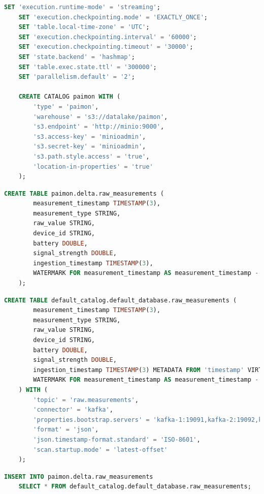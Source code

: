 \begin{lstlisting}[language=sql]
    SET 'execution.runtime-mode' = 'streaming';
    SET 'execution.checkpointing.mode' = 'EXACTLY_ONCE';
    SET 'table.local-time-zone' = 'UTC';
    SET 'execution.checkpointing.interval' = '60000';
    SET 'execution.checkpointing.timeout' = '30000';
    SET 'state.backend' = 'hashmap';
    SET 'table.exec.state.ttl' = '300000';
    SET 'parallelism.default' = '2';

    CREATE CATALOG paimon WITH (
        'type' = 'paimon',
        'warehouse' = 's3://datalake/paimon',
        's3.endpoint' = 'http://minio:9000',
        's3.access-key' = 'minioadmin',  
        's3.secret-key' = 'minioadmin',
        's3.path.style.access' = 'true',
        'location-in-properties' = 'true'
    );
\end{lstlisting}

\begin{lstlisting}[language=sql]
    CREATE TABLE paimon.delta.raw_measurements (
        measurement_timestamp TIMESTAMP(3),
        measurement_type STRING,
        raw_value STRING,
        device_id STRING,
        battery DOUBLE,
        signal_strength DOUBLE,
        ingestion_timestamp TIMESTAMP(3),
        WATERMARK FOR measurement_timestamp AS measurement_timestamp - INTERVAL '10' SECONDS
    );
\end{lstlisting}

\newpage

\begin{lstlisting}[language=sql]
    CREATE TABLE default_catalog.default_database.raw_measurements (
        measurement_timestamp TIMESTAMP(3),
        measurement_type STRING,
        raw_value STRING,
        device_id STRING,
        battery DOUBLE,
        signal_strength DOUBLE,
        ingestion_timestamp TIMESTAMP(3) METADATA FROM 'timestamp' VIRTUAL,
        WATERMARK FOR measurement_timestamp AS measurement_timestamp - INTERVAL '10' SECONDS
    ) WITH (
        'topic' = 'raw.measurements',
        'connector' = 'kafka',
        'properties.bootstrap.servers' = 'kafka-1:19091,kafka-2:19092,kafka-3:19093',
        'format' = 'json',
        'json.timestamp-format.standard' = 'ISO-8601',
        'scan.startup.mode' = 'latest-offset'
    );
\end{lstlisting}

\begin{lstlisting}[language=sql]
    INSERT INTO paimon.delta.raw_measurements
    SELECT * FROM default_catalog.default_database.raw_measurements;
\end{lstlisting}

